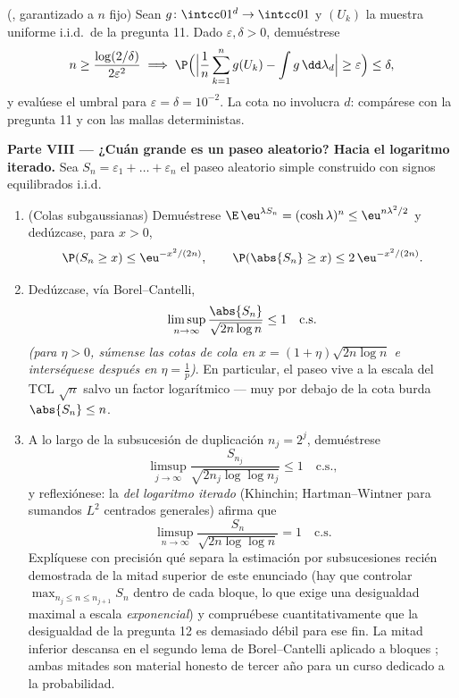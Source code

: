 \begin{problem}
\begin{enumerate}[resume]
        (, garantizado a
        $n$ fijo) Sean $g
        \colon \intcc01^d \to \intcc01$
         y $(U_k)$ la
        muestra uniforme i.i.d.\ de la pregunta 11. Dado
        $\varepsilon, \delta > 0$, demuéstrese
        \[
        n \geq \frac{\log(2/\delta)}{2\varepsilon^2}
        \implies
        \P\Bigl(\Bigl|\frac1n\sum_{k=1}^ng(U_k) -
        \int g\,\dd\lambda_d\Bigr| \geq \varepsilon\Bigr)
        \leq \delta,
        \]
        y evalúese el umbral para $\varepsilon =
        \delta = 10^{-2}$. La cota no involucra $d$: compárese con la
        pregunta 11 y con las mallas deterministas.
\end{enumerate}

\medskip
\noindent\textbf{Parte VIII --- ¿Cuán grande es un paseo aleatorio?
Hacia el logaritmo iterado.} Sea $S_n = \varepsilon_1 +
\dots + \varepsilon_n$ el paseo aleatorio simple construido con signos
equilibrados i.i.d.
\begin{enumerate}[resume]
  \item (Colas subgaussianas) Demuéstrese $\E\,\eu^{\lambda S_n} =
        (\cosh\lambda)^n \leq \eu^{n\lambda^2/2}$ y dedúzcase, para
  $x > 0$,
        \[
        \P(S_n \geq x) \leq \eu^{-x^2/(2n)},
        \qquad
        \P(\abs{S_n} \geq x) \leq 2\,\eu^{-x^2/(2n)} .
        \]
  \item Dedúzcase, vía Borel--Cantelli,
        \[
        \limsup_{n\to\infty}\frac{\abs{S_n}}
        {\sqrt{2n\log n}} \leq 1 \quad\text{c.s.}
        \]
        \emph{(para $\eta > 0$, súmense las cotas de cola en $x =
        (1 + \eta)\sqrt{2n\log n}$ e interséquese después en
        $\eta = \frac1p$)}. En particular, el paseo vive a la escala del
        TCL $\sqrt n$ salvo un factor logarítmico --- muy por debajo de
        la cota burda $\abs{S_n} \leq n$. \item A lo largo de la
        subsucesión de duplicación $n_j = 2^j$, demuéstrese
        \[
        \limsup_{j\to\infty}\frac{S_{n_j}}
        {\sqrt{2n_j\log\log n_j}} \leq 1 \quad\text{c.s.},
        \]
        y reflexiónese: la \emph{
        del logaritmo iterado} (Khinchin; Hartman--Wintner para sumandos
        $L^2$ centrados generales) afirma que
        \[
        \limsup_{n\to\infty}\frac{S_n}
        {\sqrt{2n\log\log n}} = 1 \quad\text{c.s.}
        \]
        Explíquese con precisión qué separa la estimación por
        subsucesiones recién demostrada de la mitad superior de este
        enunciado (hay que controlar $\max_{n_j \leq n \leq
        n_{j+1}}S_n$ dentro de cada bloque, lo que exige una desigualdad
        maximal a escala \emph{exponencial}) y compruébese
        cuantitativamente que la desigualdad de la pregunta 12 es
        demasiado débil para ese fin. La mitad inferior descansa en el
        segundo lema de Borel--Cantelli aplicado a bloques
        ; ambas
        mitades son material honesto de tercer año para un curso
        dedicado a la probabilidad.


\end{enumerate}
\end{problem}
